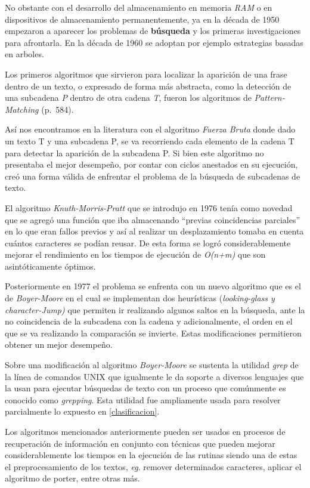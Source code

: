 \documentclass[
  10,
  spanish,
  openany]{book}
\begin{document}
No obstante con el desarrollo del almacenamiento en memoria \emph{RAM} o en dispositivos de almacenamiento permanentemente, ya en la década de 1950 empezaron a aparecer los problemas de \textbf{búsqueda} y los primeras investigaciones para afrontarla. En la década de 1960 se adoptan por ejemplo estrategias basadas en arboles.

Los primeros algoritmos que sirvieron para localizar la aparición de una frase dentro de un texto, o expresado de forma más abstracta, como la detección de una subcadena \emph{P} dentro de otra cadena \emph{T}, fueron los algoritmos de \emph{Pattern-Matching} \citep{goodrich2013} (p.~584).

Así nos encontramos en la literatura con el algoritmo \emph{Fuerza Bruta} donde dado un texto T y una subcadena P, se va recorriendo cada elemento de la cadena T para detectar la aparición de la subcadena P. Si bien este algoritmo no presentaba el mejor desempeño, por contar con ciclos anestados en su ejecución, creó una forma válida de enfrentar el problema de la búsqueda de subcadenas de texto.

El algoritmo \emph{Knuth-Morris-Pratt} que se introdujo en 1976 tenía como novedad que se agregó una función que iba almacenando ``previas coincidencias parciales'' en lo que eran fallos previos y así al realizar un desplazamiento tomaba en cuenta cuántos caracteres se podían reusar. De esta forma se logró considerablemente mejorar el rendimiento en los tiempos de ejecución de \emph{O(n+m)} que son asintóticamente óptimos.

Posteriormente en 1977 el problema se enfrenta con un nuevo algoritmo que es el de \emph{Boyer-Moore} en el cual se implementan dos heurísticas (\emph{looking-glass y} \emph{character-Jump)} que permiten ir realizando algunos saltos en la búsqueda, ante la no coincidencia de la subcadena con la cadena y adicionalmente, el orden en el que se va realizando la comparación se invierte. Estas modificaciones permitieron obtener un mejor desempeño.

Sobre una modificación al algoritmo \emph{Boyer-Moore} se sustenta la utilidad \emph{grep} de la línea de comandos UNIX que igualmente le da soporte a diversos lenguajes que la usan para ejecutar búsquedas de texto con un proceso que comúnmente es conocido como \emph{grepping}. Esta utilidad fue ampliamente usada para resolver parcialmente lo expuesto en \ref{clasificacion}.

Los algoritmos mencionados anteriormente pueden ser usados en procesos de recuperación de información en conjunto con técnicas que pueden mejorar considerablemente los tiempos en la ejecución de las rutinas siendo una de estas el preprocesamiento de los textos, \emph{eg}. remover determinados caracteres, aplicar el algoritmo de porter, entre otras más.
\end{document}
